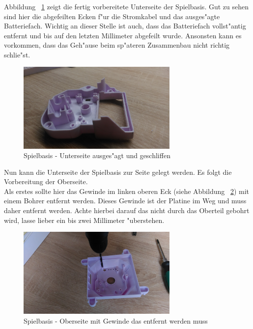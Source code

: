 Abbildung ~\ref{fig9} zeigt die fertig vorbereitete Unterseite der Spielbasis. Gut zu sehen sind hier die abgefeilten Ecken f"ur die Stromkabel und das ausges"agte Batteriefach.
Wichtig an dieser Stelle ist auch, dass das Batteriefach vollst"antig entfernt und bis auf den letzten Millimeter abgefeilt wurde. Ansonsten kann es vorkommen, dass das Geh"ause beim sp"ateren Zusammenbau nicht richtig schlie"st.

\vspace{1cm}
\begin{figure}[!ht]
	\centering
  	\includegraphics[width=0.7\textwidth]{pictures/loolou_009.jpg}
	\caption{Spielbasis - Unterseite ausges"agt und geschliffen}
	\label{fig9}
\end{figure}
\vspace{0.5cm}

Nun kann die Unterseite der Spielbasis zur Seite gelegt werden. Es folgt die Vorbereitung der Oberseite. \\
Als erstes sollte hier das Gewinde im linken oberen Eck (siehe Abbildung ~\ref{fig10}) mit einem Bohrer entfernt werden. Dieses Gewinde ist der Platine im Weg und muss daher entfernt werden.
Achte hierbei darauf das nicht durch das Oberteil gebohrt wird, lasse lieber ein bis zwei Millimeter "uberstehen.
 
\vspace{1cm}
\begin{figure}[!ht]
	\centering
  	\includegraphics[width=0.7\textwidth]{pictures/loolou_010.jpg}
	\caption{Spielbasis - Oberseite mit Gewinde das entfernt werden muss}
	\label{fig10}
\end{figure}
\vspace{0.5cm}

